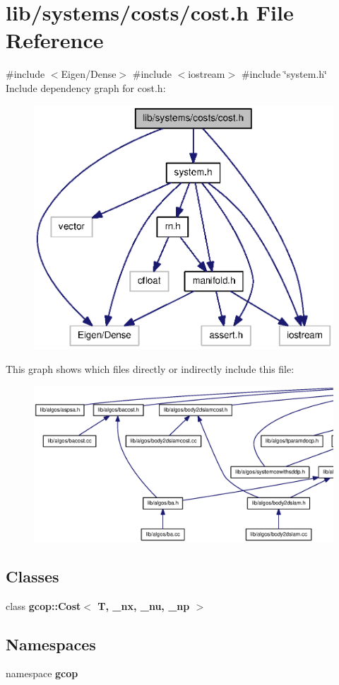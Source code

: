 \section{lib/systems/costs/cost.h \-File \-Reference}
\label{cost_8h}
{\ttfamily \#include $<$\-Eigen/\-Dense$>$}\*
{\ttfamily \#include $<$iostream$>$}\*
{\ttfamily \#include \char`\"{}system.\-h\char`\"{}}\*
\-Include dependency graph for cost.\-h\-:\nopagebreak
\begin{figure}[H]
\begin{center}
\leavevmode
\includegraphics[width=350pt]{cost_8h__incl}
\end{center}
\end{figure}
\-This graph shows which files directly or indirectly include this file\-:
\nopagebreak
\begin{figure}[H]
\begin{center}
\leavevmode
\includegraphics[width=350pt]{cost_8h__dep__incl}
\end{center}
\end{figure}
\subsection*{\-Classes}
\begin{DoxyCompactItemize}
\item 
class {\bf gcop\-::\-Cost$<$ T, \-\_\-nx, \-\_\-nu, \-\_\-np $>$}
\end{DoxyCompactItemize}
\subsection*{\-Namespaces}
\begin{DoxyCompactItemize}
\item 
namespace {\bf gcop}
\end{DoxyCompactItemize}
